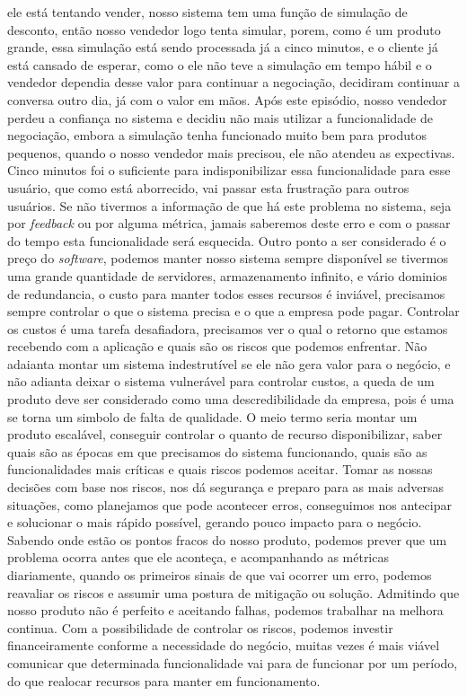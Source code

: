   ele está tentando vender, nosso sistema tem uma função de simulação de desconto,
  então nosso vendedor logo tenta simular, porem, como é um produto grande, essa
  simulação está sendo processada já a cinco minutos, e o cliente já está cansado
  de esperar, como o ele não teve a simulação em tempo hábil e o vendedor dependia
  desse valor para continuar a negociação, decidiram continuar a conversa outro dia,
  já com o valor em mãos. Após este episódio, nosso vendedor perdeu a confiança
  no sistema e decidiu não mais utilizar a funcionalidade de negociação, embora a
  simulação tenha funcionado muito bem para produtos pequenos, quando o nosso
  vendedor mais precisou, ele não atendeu as expectivas. Cinco minutos foi o
  suficiente para indisponibilizar essa funcionalidade para esse usuário, que
  como está aborrecido, vai passar esta frustração para outros usuários. Se não
  tivermos a informação de que há este problema no sistema, seja por \textit{feedback}
  ou por alguma métrica, jamais saberemos deste erro e com o passar do tempo
  esta funcionalidade será esquecida. \newline
  Outro ponto a ser considerado é o preço do \textit{software}, podemos manter
  nosso sistema sempre disponível se tivermos uma grande quantidade de servidores,
  armazenamento infinito, e vário dominios de redundancia, o custo para manter
  todos esses recursos é inviável, precisamos sempre controlar o que o sistema
  precisa e o que a empresa pode pagar. Controlar os custos é uma tarefa
  desafiadora, precisamos ver o qual o retorno que estamos recebendo com a aplicação
  e quais são os riscos que podemos enfrentar. Não adaianta montar um sistema
  indestrutível se ele não gera valor para o negócio, e não adianta deixar o
  sistema vulnerável para controlar custos, a queda de um produto deve ser
  considerado como uma descredibilidade da empresa, pois é uma se torna um
  simbolo de falta de qualidade. O meio termo seria montar um produto escalável,
  conseguir controlar o quanto de recurso disponibilizar, saber quais são as
  épocas em que precisamos do sistema funcionando, quais são as funcionalidades
  mais críticas e quais riscos podemos aceitar. Tomar as nossas decisões com
  base nos riscos, nos dá segurança e preparo para as mais adversas situações,
  como planejamos que pode acontecer erros, conseguimos nos antecipar e solucionar
  o mais rápido possível, gerando pouco impacto para o negócio. Sabendo onde estão
  os pontos fracos do nosso produto, podemos prever que um problema ocorra antes
  que ele aconteça, e acompanhando as métricas diariamente, quando os primeiros
  sinais de que vai ocorrer um erro, podemos reavaliar os riscos e assumir uma
  postura de mitigação ou solução. Admitindo que nosso produto não é perfeito e
  aceitando falhas, podemos trabalhar na melhora continua. Com a possibilidade
  de controlar os riscos, podemos investir financeiramente conforme a necessidade
  do negócio, muitas vezes é mais viável comunicar que determinada funcionalidade
  vai para de funcionar por um período, do que realocar recursos para manter em
  funcionamento.

